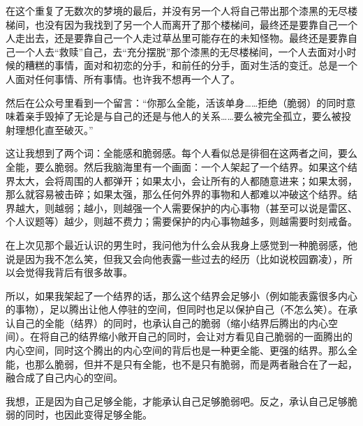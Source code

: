 在这个重复了无数次的梦境的最后，并没有另一个人将自己带出那个漆黑的无尽楼梯间，也没有因为我找到了另一个人而离开了那个楼梯间，最终还是要靠自己一个人走出去，还是要靠自己一个人走过草丛里可能存在的未知怪物。最终还是要靠自己一个人去“救赎”自己，去“充分摆脱”那个漆黑的无尽楼梯间，一个人去面对小时候的糟糕的事情，面对和初恋的分手，和前任的分手，面对生活的变迁。总是一个人面对任何事情、所有事情。也许我不想再一个人了。

\tristarsepline

然后在公众号里看到一个留言：“你那么全能，活该单身……拒绝（脆弱）的同时意味着亲手毁掉了无论是与自己的还是与他人的关系……要么被完全孤立，要么被投射理想化直至破灭。”

这让我想到了两个词：全能感和脆弱感。每个人看似总是徘徊在这两者之间，要么全能，要么脆弱。然后我脑海里有一个画面：一个人架起了一个结界。如果这个结界太大，会将周围的人都弹开；如果太小，会让所有的人都随意进来；如果太弱，那么就容易被击碎；如果太强，那么任何外界的事物和人都难以冲破这个结界。结界越大，则越弱；越小，则越强\pozhehao{}一个人需要保护的内心事物（甚至可以说是雷区、个人议题等）越少，则越不费力；需要保护的内心事物越多，则越需要时刻戒备。

在上次见那个最近认识的男生时，我问他为什么会从我身上感觉到一种脆弱感，他说是因为我不怎么笑，但我又会向他表露一些过去的经历（比如说校园霸凌），所以会觉得我背后有很多故事。

所以，如果我架起了一个结界的话，那么这个结界会足够小（例如能表露很多内心的事物），足以腾出让他人停驻的空间，但同时也足以保护自己（不怎么笑）。在承认自己的全能（结界）的同时，也承认自己的脆弱（缩小结界后腾出的内心空间）。在将自己的结界缩小\pozhehao{}敞开自己的同时，会让对方看见自己脆弱的一面\pozhehao{}腾出的内心空间，同时这个腾出的内心空间的背后也是一种更全能、更强的结界。那么全能，也那么脆弱，但并不是只有全能，也不是只有脆弱，而是两者融合在了一起，融合成了自己内心的空间。

我想，正是因为自己足够全能，才能承认自己足够脆弱吧。反之，承认自己足够脆弱的同时，也因此变得足够全能。
